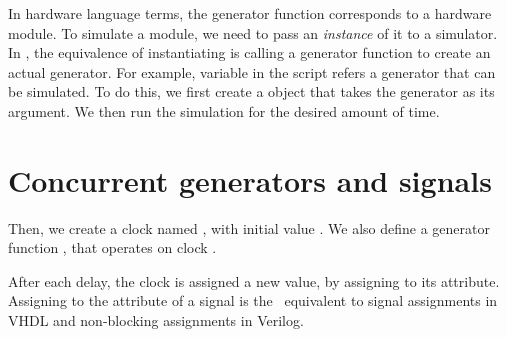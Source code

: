 In hardware language terms, the generator function corresponds to a
hardware module. To simulate a module, we need to pass an
\emph{instance} of it to a simulator. In \myhdl{}, the equivalence of
instantiating is calling a generator function to create an actual
generator. For example, variable  in the script refers a
generator that can be simulated. To do this, we first create a
 object that takes the generator as its argument. We
then run the simulation for the desired amount of time.

\section{Concurrent generators and signals}



Then, we create a clock  named , with initial
value . We also define a generator function ,
that operates on clock . 

After each delay, the clock is assigned a new value, by
assigning to its  attribute. Assigning to the 
 attribute of a signal is the \myhdl\ equivalent to signal
assignments in VHDL and non-blocking assignments in Verilog.









